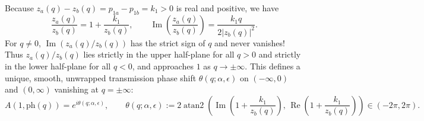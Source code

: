 \documentclass[11pt,a4paper]{article}
\theoremstyle{remark}
\begin{document}
Because $z_a(q)-z_b(q)=p_{1a}-p_{1b}=k_1>0$ is real and positive, we have
\begin{equation}\label{eq:w_ratio}
\frac{z_a(q)}{z_b(q)}=1+\frac{k_1}{z_b(q)},\qquad
\operatorname{Im}\left(\frac{z_a(q)}{z_b(q)}\right)=\frac{k_1 q}{2|z_b(q)|^2}.
\end{equation}
For $q\neq 0$, $\operatorname{Im}(z_a(q)/z_b(q))$ has the strict sign of $q$ and never vanishes! Thus $z_a(q)/z_b(q)$ lies strictly in the upper half-plane for all $q>0$ and strictly in the lower half-plane for all $q<0$, and approaches $1$ as $q\to\pm\infty$. This defines a unique, smooth, unwrapped transmission phase shift $\theta(q;\alpha,\epsilon)$ on $(-\infty,0)$ and $(0,\infty)$ vanishing at $q=\pm\infty$:
\begin{equation}\label{eq:theta_def}
A(1,\mathrm{ph}(q))=e^{i\theta(q;\alpha,\epsilon)},\qquad
\theta(q;\alpha,\epsilon):=2\operatorname{atan2}\!\left(\operatorname{Im}\left(1+\frac{k_1}{z_b(q)}\right),\,\operatorname{Re}\left(1+\frac{k_1}{z_b(q)}\right)\right)\in(-2\pi,2\pi).
\end{equation}
\end{document}
